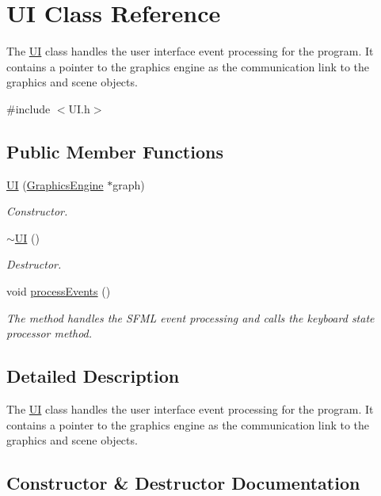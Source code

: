 \hypertarget{class_u_i}{}\section{UI Class Reference}
\label{class_u_i}


The \hyperlink{class_u_i}{UI} class handles the user interface event processing for the program. It contains a pointer to the graphics engine as the communication link to the graphics and scene objects.  




{\ttfamily \#include $<$U\+I.\+h$>$}

\subsection*{Public Member Functions}
\begin{DoxyCompactItemize}
\item 
\hyperlink{class_u_i_a9c605272304cb2d5efff79edb32e9241}{UI} (\hyperlink{class_graphics_engine}{Graphics\+Engine} $\ast$graph)
\begin{DoxyCompactList}\small\item\em Constructor. \end{DoxyCompactList}\item 
\hyperlink{class_u_i_a1b23d0c64c7cbb3d143d90ec532a7ccd}{$\sim$\+UI} ()
\begin{DoxyCompactList}\small\item\em Destructor. \end{DoxyCompactList}\item 
void \hyperlink{class_u_i_a440e133dbf19d82b8b40809644494068}{process\+Events} ()
\begin{DoxyCompactList}\small\item\em The method handles the S\+F\+ML event processing and calls the keyboard state processor method. \end{DoxyCompactList}\end{DoxyCompactItemize}


\subsection{Detailed Description}
The \hyperlink{class_u_i}{UI} class handles the user interface event processing for the program. It contains a pointer to the graphics engine as the communication link to the graphics and scene objects. 

\subsection{Constructor \& Destructor Documentation}
\mbox{\label{class_u_i_a9c605272304cb2d5efff79edb32e9241}} 
